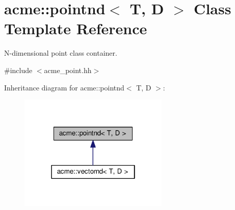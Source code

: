 \hypertarget{classacme_1_1pointnd}{}\section{acme\+:\+:pointnd$<$ T, D $>$ Class Template Reference}
\label{classacme_1_1pointnd}


N-\/dimensional point class container.  




{\ttfamily \#include $<$acme\+\_\+point.\+hh$>$}



Inheritance diagram for acme\+:\+:pointnd$<$ T, D $>$\+:
\nopagebreak
\begin{figure}[H]
\begin{center}
\leavevmode
\includegraphics[width=202pt]{d2/d2b/classacme_1_1pointnd__inherit__graph}
\end{center}
\end{figure}
